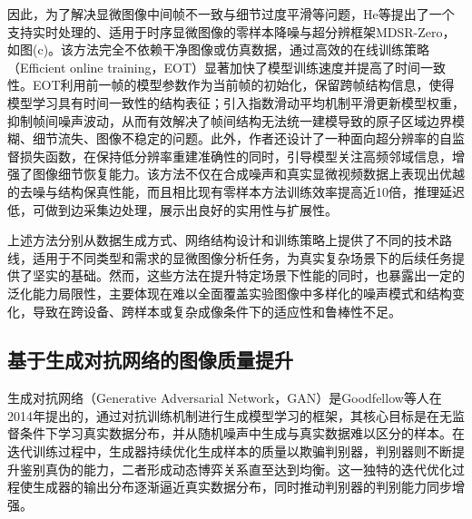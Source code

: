 因此，为了解决显微图像中间帧不一致与细节过度平滑等问题，He等\cite{he2025efficient}提出了一个支持实时处理的、适用于时序显微图像的零样本降噪与超分辨框架MDSR-Zero，如图(c)。该方法完全不依赖干净图像或仿真数据，通过高效的在线训练策略（Efficient online training，EOT）显著加快了模型训练速度并提高了时间一致性。EOT利用前一帧的模型参数作为当前帧的初始化，保留跨帧结构信息，使得模型学习具有时间一致性的结构表征；引入指数滑动平均机制平滑更新模型权重，抑制帧间噪声波动，从而有效解决了帧间结构无法统一建模导致的原子区域边界模糊、细节流失、图像不稳定的问题。此外，作者还设计了一种面向超分辨率的自监督损失函数，在保持低分辨率重建准确性的同时，引导模型关注高频邻域信息，增强了图像细节恢复能力。该方法不仅在合成噪声和真实显微视频数据上表现出优越的去噪与结构保真性能，而且相比现有零样本方法训练效率提高近10倍，推理延迟低，可做到边采集边处理，展示出良好的实用性与扩展性。

上述方法分别从数据生成方式、网络结构设计和训练策略上提供了不同的技术路线，适用于不同类型和需求的显微图像分析任务，为真实复杂场景下的后续任务提供了坚实的基础。然而，这些方法在提升特定场景下性能的同时，也暴露出一定的泛化能力局限性，主要体现在难以全面覆盖实验图像中多样化的噪声模式和结构变化，导致在跨设备、跨样本或复杂成像条件下的适应性和鲁棒性不足。

\subsection{基于生成对抗网络的图像质量提升}
生成对抗网络（Generative Adversarial Network，GAN）是Goodfellow\cite{goodfellow2014generative}等人在2014年提出的，通过对抗训练机制进行生成模型学习的框架，其核心目标是在无监督条件下学习真实数据分布，并从随机噪声中生成与真实数据难以区分的样本。在迭代训练过程中，生成器持续优化生成样本的质量以欺骗判别器，判别器则不断提升鉴别真伪的能力，二者形成动态博弈关系直至达到均衡。这一独特的迭代优化过程使生成器的输出分布逐渐逼近真实数据分布，同时推动判别器的判别能力同步增强。

